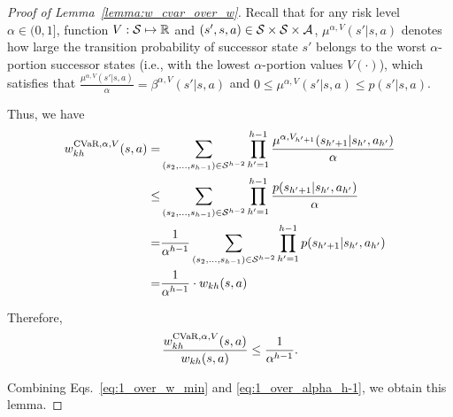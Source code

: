 \begin{proof}[Proof of Lemma~\ref{lemma:w_cvar_over_w}]
	Recall that for any risk level $\alpha \in (0,1]$, function $V: \mathcal{S} \mapsto \mathbb{R}$ and $(s',s,a) \in \mathcal{S} \times \mathcal{S} \times \mathcal{A}$, $\mu^{\alpha,V}(s'|s,a)$ denotes how large the transition probability of successor state $s'$ belongs to the worst $\alpha$-portion successor states (i.e., with the lowest $\alpha$-portion values $V(\cdot)$), which satisfies that  $\frac{\mu^{\alpha,V}(s'|s,a)}{\alpha} = \beta^{\alpha,V}(s'|s,a)$ and $0 \leq \mu^{\alpha,V}(s'|s,a) \leq p(s'|s,a)$.
	
	Thus, we have
	\begin{align*}
		w^{\textup{CVaR},\alpha,V}_{kh}(s,a) = & \sum_{(s_2,\dots,s_{h-1}) \in \mathcal{S}^{h-2}} \prod_{h'=1}^{h-1} \frac{\mu^{\alpha,V_{h'+1}}(s_{h'+1}|s_{h'},a_{h'})}{\alpha}
		\\
		\leq & \sum_{(s_2,\dots,s_{h-1}) \in \mathcal{S}^{h-2}} \prod_{h'=1}^{h-1} \frac{p(s_{h'+1}|s_{h'},a_{h'})}{\alpha}
		\\
		= & \frac{1}{\alpha^{h-1}} \sum_{(s_2,\dots,s_{h-1}) \in \mathcal{S}^{h-2}} \prod_{h'=1}^{h-1} p(s_{h'+1}|s_{h'},a_{h'})
		\\
		= & \frac{1}{\alpha^{h-1}} \cdot w_{kh}(s,a)
	\end{align*}
	
	Therefore,
	\begin{align}
		\frac{w^{\textup{CVaR},\alpha,V}_{kh}(s,a)}{w_{kh}(s,a)} \leq \frac{1}{\alpha^{h-1}} . \label{eq:1_over_alpha_h-1}
	\end{align}
	
	Combining Eqs.~\eqref{eq:1_over_w_min} and \eqref{eq:1_over_alpha_h-1}, we obtain this lemma.
\end{proof}

